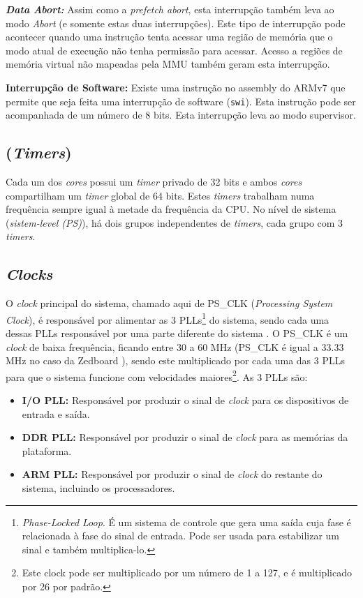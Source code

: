 \textbf{\emph{Data Abort:}} Assim como a \emph{prefetch abort}, esta interrupção também leva ao modo \emph{Abort} (e somente estas duas interrupções). Este tipo de interrupção pode acontecer quando uma instrução tenta acessar uma região de memória que o modo atual de execução não tenha permissão para acessar. Acesso a regiões de memória virtual não mapeadas pela MMU também geram esta interrupção.


\textbf{Interrupção de Software: } Existe uma instrução no assembly do ARMv7 que permite que seja feita uma interrupção de software (\verb+swi+). Esta instrução pode ser acompanhada de um número de 8 bits. Esta interrupção leva ao modo supervisor.

\subsection{(\emph{Timers})}
Cada um dos \emph{cores} possui um \emph{timer} privado de 32 bits e ambos \emph{cores} compartilham um \emph{timer} global de 64 bits. Estes \emph{timers} trabalham numa frequência sempre igual à metade da frequência da CPU.
No nível de sistema (\emph{sistem-level (PS)}), há dois grupos independentes de \emph{timers}, cada grupo com 3 \emph{timers}.




\subsection{\emph{Clocks}}

O \emph{clock} principal do sistema, chamado aqui de PS\_CLK (\emph{Processing System Clock}), é responsável por alimentar as 3 PLLs\footnote{\emph{Phase-Locked Loop}. É um sistema de controle que gera uma saída cuja fase é relacionada à fase do sinal de entrada. Pode ser usada para estabilizar um sinal e também multiplica-lo.} do sistema, sendo cada uma dessas PLLs responsável por uma parte diferente do sistema \cite[p.~622]{ug585}. O PS\_CLK é um \emph{clock} de baixa frequência, ficando entre 30 a 60 MHz (PS\_CLK é igual a 33.33 MHz no caso da Zedboard \cite[p.~19]{zed_manual}), sendo este multiplicado por cada uma das 3 PLLs para que o sistema funcione com velocidades maiores\footnote{Este clock pode ser multiplicado por um número de 1 a 127, e é multiplicado por 26 por padrão.}. As 3 PLLs são:

\begin{itemize}
	\item \textbf{I/O PLL:} Responsável por produzir o sinal de \emph{clock} para os dispositivos de entrada e saída.
	\item \textbf{DDR PLL:} Responsável por produzir o sinal de \emph{clock} para as memórias da plataforma.
	\item \textbf{ARM PLL:} Responsável por produzir o sinal de \emph{clock} do restante do sistema, incluindo os processadores.
\end{itemize}

